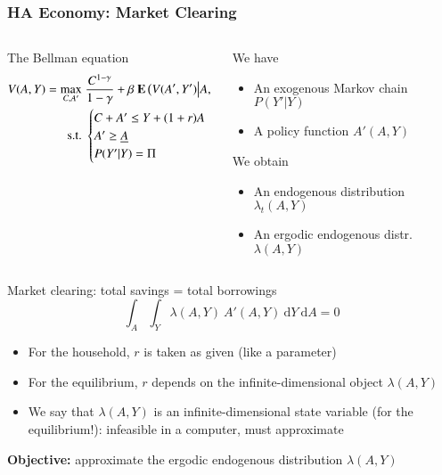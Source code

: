 \documentclass[10pt, aspectratio=1610, natbib, handout]{beamer}
\begin{document}
  \begin{frame}
    \frametitle{HA Economy: Market Clearing}

    \begin{columns}[T]
      \begin{column}{0.48\textwidth}
        The Bellman equation
        \begin{align*}
          V(A, Y) = \max_{C, A'} &\; \frac{C^{1-\gamma}}{1-\gamma} + \beta\ \mathbf{E} \left( V(A', Y') \middle| A, Y \right) \\
          \text{s.t.} &\;
          \begin{cases}
            C + A' \leq Y + (1 + r) A \\
            A' \geq \underline{A} \\
            P(Y' | Y) = \Pi
          \end{cases}
        \end{align*}
      \end{column}
      \begin{column}{0.48\textwidth}
        We have
        \begin{itemize}
          \item An exogenous Markov chain $P(Y' | Y)$
          \item A policy function $A'(A, Y)$
        \end{itemize}
        \vspace{1em}
        We obtain
        \begin{itemize}
          \item An endogenous distribution $\lambda_t(A, Y)$
          \item An ergodic endogenous distr.~$\lambda(A, Y)$
        \end{itemize}
      \end{column}
    \end{columns}

    \vfill\pause

    Market clearing: total savings = total borrowings
    \begin{equation*}
      \int_A \int_Y \lambda(A, Y)\ A'(A, Y)\ \text{d} Y\ \text{d} A = 0
    \end{equation*}
    \begin{itemize}
      \item For the household, $r$ is taken as given (like a parameter)
      \item For the equilibrium, $r$ depends on the infinite-dimensional object $\lambda(A, Y)$
      \item We say that $\lambda(A, Y)$ is an infinite-dimensional state variable (for the equilibrium!): infeasible in a computer, must approximate
    \end{itemize}

    \vfill\pause

    \textbf{Objective:} approximate the ergodic endogenous distribution $\lambda(A, Y)$
  \end{frame}
\end{document}
